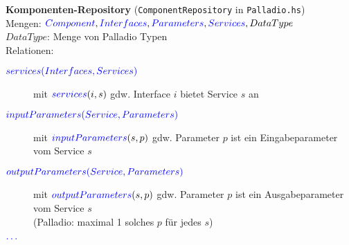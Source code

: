 \textbf{Komponenten-Repository} (\texttt{ComponentRepository} in \texttt{Palladio.hs})\\


Mengen: ${\color{blue}{Component}}, {\color{blue}{Interfaces}}, {\color{blue}{Parameters}}, {\color{blue}{Services}}, DataType$ \\

$DataType$: Menge von Palladio Typen \\

Relationen:
\begin{description}
  \item[${\color{blue}{services(Interfaces, Services)}}$]
        mit ${\color{blue}{services}}(i, s)$ gdw. Interface $i$ bietet Service $s$ an
  \item[${\color{blue}{inputParameters(Service, Parameters)}}$]
        mit ${\color{blue}{inputParameters}}(s, p)$ gdw. Parameter $p$ ist ein Eingabeparameter vom Service $s$
  \item[${\color{blue}{outputParameters(Service, Parameters)}}$]
        mit ${\color{blue}{outputParameters}}(s, p)$ gdw. Parameter $p$ ist ein Ausgabeparameter vom Service $s$ \\
        (Palladio: maximal 1 solches $p$ für jedes $s$)
  \item[${\color{blue}{\ldots}}$]
\end{description} 

